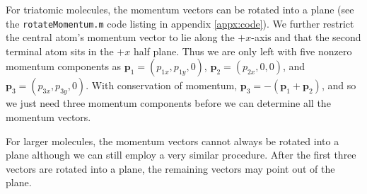 For triatomic molecules, the momentum vectors can be rotated into a plane (see the \texttt{rotateMomentum.m} code listing in appendix \ref{appx:code}). We further restrict the central atom's momentum vector to lie along the $+x$-axis and that the second terminal atom sits in the $+x$ half plane. Thus we are only left with five nonzero momentum components as $\mathbf{p}_1 = (p_{1x}, p_{1y}, 0)$, $\mathbf{p}_2 = (p_{2x}, 0, 0)$, and $\mathbf{p}_3 = (p_{3x}, p_{3y}, 0)$. With conservation of momentum, $\mathbf{p}_3 = -(\mathbf{p}_1 + \mathbf{p}_2)$, and so we just need three momentum components before we can determine all the momentum vectors.

For larger molecules, the momentum vectors cannot always be rotated into a plane although we can still employ a very similar procedure. After the first three vectors are rotated into a plane, the remaining vectors may point out of the plane.
